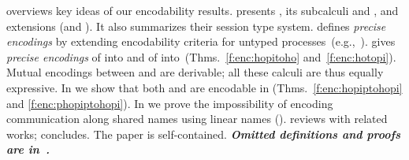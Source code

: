  overviews key ideas of our encodability results.
{} presents \HOp, its 
subcalculi \HO and \sessp, and extensions (\HOpp and \PHOp).  
It also summarizes their session type system.
 defines \emph{precise %
encodings} by extending encodability criteria 
 for
untyped processes~(e.g.,~\cite{DBLP:journals/iandc/Gorla10}).
{} %
gives \emph{precise encodings} of \HOp into \HO and of \HOp into~\sessp (Thms.~\ref{f:enc:hopitoho} and~\ref{f:enc:hotopi}).
Mutual encodings between \sessp and \HO are derivable; 
all these calculi are thus equally expressive.
In  %
we show that both \HOpp 
and \pHOp 
are encodable in \HOp
(Thms.~\ref{f:enc:hopiptohopi} and \ref{f:enc:phopiptohopi}).
In  we prove the impossibility of encoding communication along shared names
using linear names ().
{} reviews with related works;
 concludes.
The paper is self-contained. 
{\bf\em Omitted definitions and  proofs 
are in~\cite{KouzapasPY15}.} 

